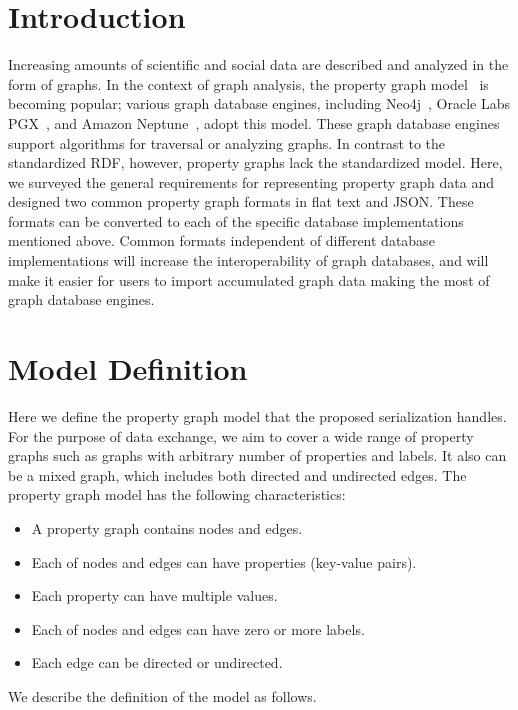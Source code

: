 \documentclass[runningheads]{llncs}
\begin{document}
\section{Introduction}
Increasing amounts of scientific and social data are described and analyzed in the form of graphs.
In the context of graph analysis, the property graph model~\cite{angles} is becoming popular; various graph database engines, including Neo4j~\cite{neo4j}, Oracle Labs PGX~\cite{pgx}, and Amazon Neptune~\cite{neptune}, adopt this model. These graph database engines support algorithms for traversal or analyzing graphs. 
In contrast to the standardized RDF, however, 
property graphs lack the standardized model.
Here, we surveyed the general requirements for representing property graph data and designed two common property graph formats in flat text and JSON. These formats can be converted to each of the specific database implementations mentioned above. Common formats independent of different database implementations will increase the interoperability of graph databases, and will make it easier for users to import accumulated graph data making the most of graph database engines.

\section{Model Definition}
Here we define the property graph model that the proposed serialization handles.
For the purpose of data exchange, we aim to cover a wide range of property graphs such as graphs with arbitrary number of properties and labels. It also can be a mixed graph, which includes both directed and undirected edges. The property graph model has the following characteristics:

\begin{itemize}
    \item A property graph contains nodes and edges.
    \item Each of nodes and edges can have properties (key-value pairs).
    \item Each property can have multiple values.
    \item Each of nodes and edges can have zero or more labels.
    \item Each edge can be directed or undirected.
\end{itemize}
We describe the definition of the model as follows.
\end{document}
